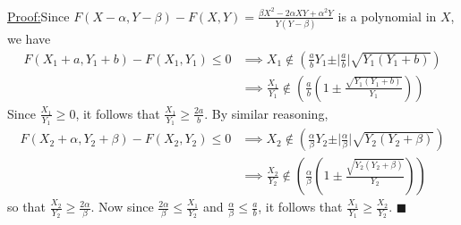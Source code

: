 \documentclass{article}
\theoremstyle{case}
\newenvironment{claim}[1]{\par\noindent\underline{Claim:}\space#1}{}
\newenvironment{claimproof}[1]{\par\noindent\underline{Proof:}\space#1}{\hfill $\blacksquare$}
\begin{document}
\begin{claimproof}
Since $F(X - \alpha, Y - \beta) - F(X, Y) = \frac{\beta X^2 - 2\alpha XY + \alpha^2 Y}{Y\left( Y-\beta\right)}$ is a polynomial in $X$, we have
\begin{align*}
F(X_1+a, Y_1+b) - F(X_1,Y_1) \leq 0 & \implies X_1 \not \in \left( \frac{a}{b}Y_1 \pm \vert \frac{a}{b} \vert \sqrt{Y_1\left( Y_1+b\right) } \right) \\
& \implies \frac{X_1}{Y_1} \not \in \left( \frac{a}{b} \left( 1 \pm \frac{\sqrt{Y_1\left( Y_1+b\right) }}{Y_1}\right) \right)
\end{align*}
Since $\frac{X_1}{Y_1} \geq 0$, it follows that $\frac{X_1}{Y_1} \geq \frac{2a}{b}$. By similar reasoning, 
\begin{align*}
F(X_2+\alpha, Y_2+\beta) - F(X_2,Y_2) \leq 0 & \implies X_2 \not \in \left( \frac{\alpha}{\beta}Y_2 \pm \vert \frac{\alpha}{\beta} \vert \sqrt{Y_2\left( Y_2+\beta \right) } \right) \\
& \implies \frac{X_2}{Y_2} \not \in \left( \frac{\alpha}{\beta} \left( 1 \pm \frac{\sqrt{Y_2\left( Y_2+\beta \right) }}{Y_2}\right) \right)
\end{align*}
so that $\frac{X_2}{Y_2} \geq \frac{2\alpha}{\beta}$. Now since $\frac{2\alpha}{\beta} \leq \frac{X_1}{Y_2}$ and $\frac{\alpha}{\beta} \leq \frac{a}{b}$, it follows that $\frac{X_1}{Y_1} \geq \frac{X_2}{Y_2}$.
\end{claimproof}
\end{document}
